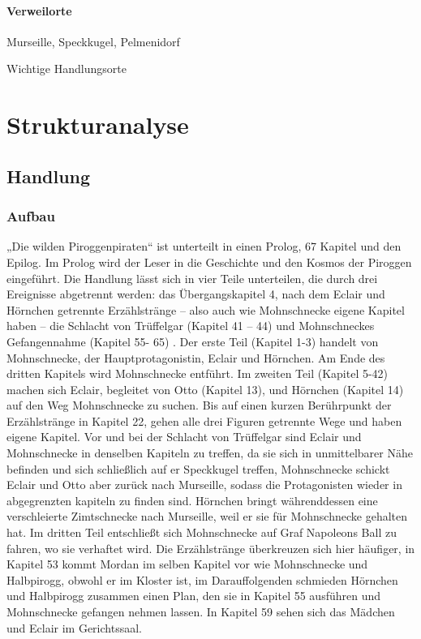 \subsubsection{Verweilorte}

Murseille, Speckkugel, Pelmenidorf 

Wichtige Handlungsorte
		
\chapter{Strukturanalyse}

\section{Handlung}
\subsection{Aufbau}
„Die wilden Piroggenpiraten“ ist unterteilt in einen Prolog, 67 Kapitel und den Epilog. Im Prolog wird der Leser in die Geschichte und den Kosmos der Piroggen eingeführt. Die Handlung lässt sich in vier Teile unterteilen, die durch drei Ereignisse abgetrennt werden: das Übergangskapitel 4, nach dem Eclair und Hörnchen getrennte Erzählstränge – also auch wie Mohnschnecke eigene Kapitel haben – die Schlacht von Trüffelgar (Kapitel 41 – 44) und Mohnschneckes Gefangennahme (Kapitel 55- 65) . Der erste Teil (Kapitel 1-3) handelt von Mohnschnecke, der Hauptprotagonistin, Eclair und Hörnchen. Am Ende des dritten Kapitels wird Mohnschnecke entführt. Im zweiten Teil (Kapitel 5-42) machen sich Eclair, begleitet von Otto (Kapitel 13), und Hörnchen (Kapitel 14) auf den Weg Mohnschnecke zu suchen. Bis auf einen kurzen Berührpunkt der Erzählstränge in Kapitel 22, gehen alle drei Figuren getrennte Wege und haben eigene Kapitel. Vor und bei der Schlacht von Trüffelgar sind Eclair und Mohnschnecke in denselben Kapiteln zu treffen, da sie sich in unmittelbarer Nähe befinden und sich schließlich auf er Speckkugel treffen,  Mohnschnecke schickt Eclair und Otto aber zurück nach Murseille, sodass die Protagonisten wieder in abgegrenzten kapiteln zu finden sind. Hörnchen bringt währenddessen eine verschleierte Zimtschnecke nach Murseille, weil er sie für Mohnschnecke gehalten hat. Im dritten Teil entschließt sich Mohnschnecke auf Graf Napoleons Ball zu fahren, wo sie verhaftet wird. Die Erzählstränge überkreuzen sich hier häufiger, in Kapitel 53 kommt Mordan im selben Kapitel vor wie Mohnschnecke und Halbpirogg, obwohl er im Kloster ist, im Darauffolgenden schmieden Hörnchen und Halbpirogg zusammen einen Plan, den sie in Kapitel 55 ausführen und Mohnschnecke gefangen nehmen lassen. In Kapitel 59 sehen sich das Mädchen und Eclair im Gerichtssaal. 

